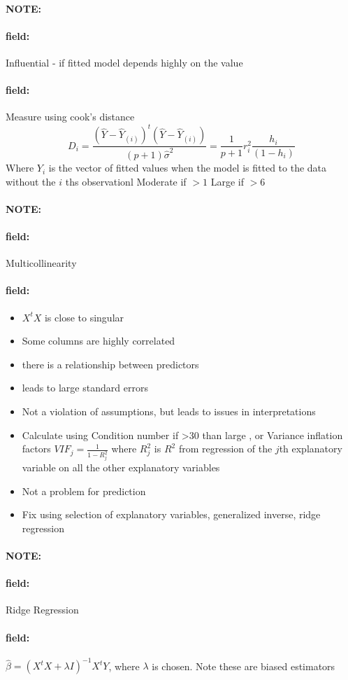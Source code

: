 \documentclass[12pt]{article}
\newenvironment{note}{\paragraph{NOTE:}}{}
\newenvironment{field}{\paragraph{field:}}{}
\begin{document}
\begin{note}
  \begin{field}
    Influential - if fitted model depends highly on the value
  \end{field}
  \begin{field}
    Measure using cook's distance
    $$ D_i = \frac{(\hat{Y} - \hat{Y}_{(i)})^t(\hat{Y} - \hat{Y}_{(i)})}{(p+1)\hat{\sigma}^2} = \frac{1}{p+1}r_i^2 \frac{h_i}{(1 - h_i)}$$
    Where $Y_{i}$ is the vector of fitted values when the model is fitted to the data without the $i$ ths observationl Moderate if $>1 $ Large if $>6$
  \end{field}
\end{note}


\begin{note}
  \begin{field}
    Multicollinearity
  \end{field}
  \begin{field}
    \begin{itemize}
      \item $X^tX$ is close to singular
      \item Some columns are highly correlated
      \item there is a relationship between predictors \item leads to large standard errors
      \item Not a violation of assumptions, but leads to issues in interpretations
      \item Calculate using Condition number if >30 than large , or Variance inflation factors $VIF_j = \frac{1}{1 - R^2_j}$ where $R^2_j$ is $R^2$ from regression of the $j$th explanatory variable on all the other explanatory variables
      \item Not a problem for prediction
      \item Fix using selection of explanatory variables, generalized inverse, ridge regression
    \end{itemize}
  \end{field}
\end{note}

\begin{note}
  \begin{field}
    Ridge Regression
  \end{field}
  \begin{field}
    $\hat{\beta} = (X^tX + \lambda I)^{-1} X^t Y$, where $\lambda$ is chosen. Note these are biased estimators
  \end{field}
\end{note}
\end{document}
